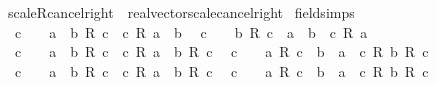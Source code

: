 \begin{isabellebody}
\isamarkupfalse%
\ scaleR{\isacharunderscore}{\kern0pt}cancel{\isacharunderscore}{\kern0pt}right\ {\isacharequal}{\kern0pt}\ real{\isacharunderscore}{\kern0pt}vector{\isachardot}{\kern0pt}scale{\isacharunderscore}{\kern0pt}cancel{\isacharunderscore}{\kern0pt}right\isanewline
\isanewline
{}\isamarkupfalse%
\ {\isacharbrackleft}{\kern0pt}field{\isacharunderscore}{\kern0pt}simps{\isacharbrackright}{\kern0pt}{\isacharcolon}{\kern0pt}\isanewline
\ \ {\isachardoublequoteopen}c\ {\isasymnoteq}\ {}\ {\isasymLongrightarrow}\ a\ {\isacharequal}{\kern0pt}\ b\ {\isacharslash}{\kern0pt}\isactrlsub R\ c\ {\isasymlongleftrightarrow}\ c\ {\isacharasterisk}{\kern0pt}\isactrlsub R\ a\ {\isacharequal}{\kern0pt}\ b{\isachardoublequoteclose}\isanewline
\ \ {\isachardoublequoteopen}c\ {\isasymnoteq}\ {}\ {\isasymLongrightarrow}\ b\ {\isacharslash}{\kern0pt}\isactrlsub R\ c\ {\isacharequal}{\kern0pt}\ a\ {\isasymlongleftrightarrow}\ b\ {\isacharequal}{\kern0pt}\ c\ {\isacharasterisk}{\kern0pt}\isactrlsub R\ a{\isachardoublequoteclose}\isanewline
\ \ {\isachardoublequoteopen}c\ {\isasymnoteq}\ {}\ {\isasymLongrightarrow}\ a\ {\isacharplus}{\kern0pt}\ b\ {\isacharslash}{\kern0pt}\isactrlsub R\ c\ {\isacharequal}{\kern0pt}\ {\isacharparenleft}{\kern0pt}c\ {\isacharasterisk}{\kern0pt}\isactrlsub R\ a\ {\isacharplus}{\kern0pt}\ b{\isacharparenright}{\kern0pt}\ {\isacharslash}{\kern0pt}\isactrlsub R\ c{\isachardoublequoteclose}\isanewline
\ \ {\isachardoublequoteopen}c\ {\isasymnoteq}\ {}\ {\isasymLongrightarrow}\ a\ {\isacharslash}{\kern0pt}\isactrlsub R\ c\ {\isacharplus}{\kern0pt}\ b\ {\isacharequal}{\kern0pt}\ {\isacharparenleft}{\kern0pt}a\ {\isacharplus}{\kern0pt}\ c\ {\isacharasterisk}{\kern0pt}\isactrlsub R\ b{\isacharparenright}{\kern0pt}\ {\isacharslash}{\kern0pt}\isactrlsub R\ c{\isachardoublequoteclose}\isanewline
\ \ {\isachardoublequoteopen}c\ {\isasymnoteq}\ {}\ {\isasymLongrightarrow}\ a\ {\isacharminus}{\kern0pt}\ b\ {\isacharslash}{\kern0pt}\isactrlsub R\ c\ {\isacharequal}{\kern0pt}\ {\isacharparenleft}{\kern0pt}c\ {\isacharasterisk}{\kern0pt}\isactrlsub R\ a\ {\isacharminus}{\kern0pt}\ b{\isacharparenright}{\kern0pt}\ {\isacharslash}{\kern0pt}\isactrlsub R\ c{\isachardoublequoteclose}\isanewline
\ \ {\isachardoublequoteopen}c\ {\isasymnoteq}\ {}\ {\isasymLongrightarrow}\ a\ {\isacharslash}{\kern0pt}\isactrlsub R\ c\ {\isacharminus}{\kern0pt}\ b\ {\isacharequal}{\kern0pt}\ {\isacharparenleft}{\kern0pt}a\ {\isacharminus}{\kern0pt}\ c\ {\isacharasterisk}{\kern0pt}\isactrlsub R\ b{\isacharparenright}{\kern0pt}\ {\isacharslash}{\kern0pt}\isactrlsub R\ c{\isachardoublequoteclose}\isanewline

\end{isabellebody}
